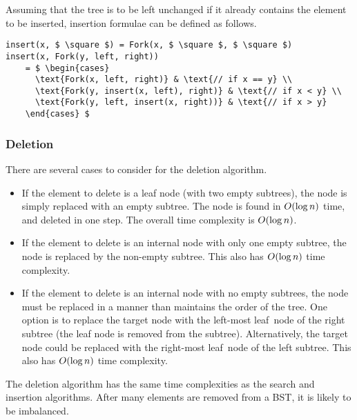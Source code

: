 Assuming that the tree is to be left unchanged if it already contains the element to be inserted, insertion formulae can be defined as follows.
\begin{lstlisting}[mathescape=true]
insert(x, $ \square $) = Fork(x, $ \square $, $ \square $)
insert(x, Fork(y, left, right))
    = $ \begin{cases}
      \text{Fork(x, left, right)} & \text{// if x == y} \\
      \text{Fork(y, insert(x, left), right)} & \text{// if x < y} \\
      \text{Fork(y, left, insert(x, right))} & \text{// if x > y}
    \end{cases} $
\end{lstlisting}

\subsubsection{Deletion}

There are several cases to consider for the deletion algorithm.
\begin{itemize}
  \item If the element to delete is a leaf node (with two empty subtrees), the node is simply replaced with an empty subtree.
  The node is found in \( O\!\left(\log n\right) \) time, and deleted in one step.
  The overall time complexity is \( O\!\left(\log n\right) \).
  \item If the element to delete is an internal node with only one empty subtree, the node is replaced by the non-empty subtree.
  This also has \( O\!\left(\log n\right) \) time complexity.
  \item If the element to delete is an internal node with no empty subtrees, the node must be replaced in a manner than maintains the order of the tree.
  One option is to replace the target node with the left-most leaf~node of the right subtree (the leaf node is removed from the subtree).
  Alternatively, the target node could be replaced with the right-most leaf~node of the left subtree.
  This also has \( O\!\left(\log n\right) \) time complexity.
\end{itemize}

The deletion algorithm has the same time complexities as the search and insertion algorithms.
After many elements are removed from a BST, it is likely to be imbalanced.

